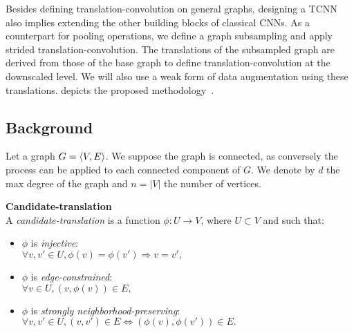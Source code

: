 Besides defining translation-convolution on general graphs, designing a TCNN also implies extending the other building blocks of classical CNNs. As a counterpart for pooling operations, we define a graph subsampling and apply strided translation-convolution. The translations of the subsampled graph are derived from those of the base graph to define translation-convolution at the downscaled level. We will also use a weak form of data augmentation using these translations.  depicts the proposed methodology~\citep{lassance2018matching}.



\subsection{Background}



Let a graph $G = \langle V, E \rangle$. We suppose the graph is connected, as conversely the process can be applied to each connected component of $G$. We denote by $d$ the max degree of the graph and $n = |V|$ the number of vertices.

\begin{definition}\textbf{Candidate-translation}\\
  A \emph{candidate-translation} is a function $\phi: U \to V$, where $U \subset V$ and such that:
  \begin{itemize}[noitemsep,nolistsep]
  \item $\phi$ is \emph{injective}:\\
  $\forall v,v' \in U, \phi(v) = \phi(v') \Rightarrow v = v',$
  \item $\phi$ is \emph{edge-constrained}:\\
  $\forall v \in U, (v,\phi(v)) \in E,$
  \item $\phi$ is \emph{strongly neighborhood-preserving}:\\
  $\forall v,v' \in U, (v,v')\in E \Leftrightarrow (\phi(v),\phi(v')) \in E.$
  \end{itemize}
\end{definition}

